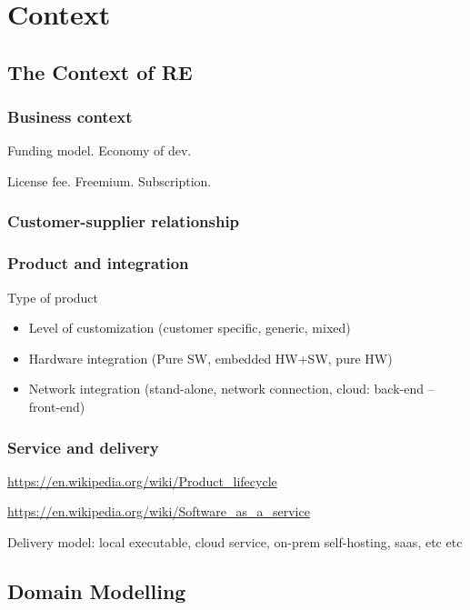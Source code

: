 
\chapter{Context}%

\section{The Context of RE}

\subsection{Business context}
Funding model. Economy of dev.

License fee. Freemium. Subscription.

\subsection{Customer-supplier relationship}

\subsection{Product and integration}

Type of product

\begin{itemize}
  \item Level of customization (customer specific, generic, mixed)
  \item Hardware integration (Pure SW, embedded HW+SW, pure HW)
  \item Network integration (stand-alone, network connection, cloud: back-end -- front-end)
\end{itemize}

\subsection{Service and delivery}

\url{https://en.wikipedia.org/wiki/Product_lifecycle}

\url{https://en.wikipedia.org/wiki/Software_as_a_service}

Delivery model: local executable, cloud service, on-prem self-hosting, saas, etc etc


\section{Domain Modelling}

